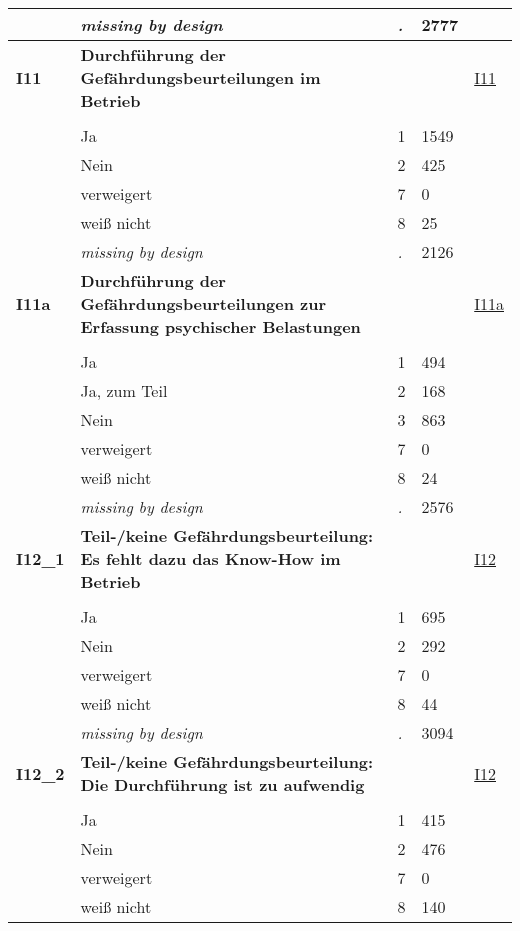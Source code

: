 \begin{longtable}{| L{2.65cm} | L{8cm} | C{1.5cm} | R{1.25cm} | C{2.25cm}  |}
   & \textit{missing by design} & \textit{.} & 2777 &  \\ 
   \midrule
\textbf{I11}\label{var:I11} & \textbf{Durchführung der Gefährdungsbeurteilungen im Betrieb} &  &  & \hyperref[I11]{I11} \\ 
   &  &  &  &  \\ 
   & Ja & 1 & 1549 &  \\ 
   & Nein & 2 & 425 &  \\ 
   & verweigert & 7 & 0 &  \\ 
   & weiß nicht & 8 & 25 &  \\ 
   & \textit{missing by design} & \textit{.} & 2126 &  \\ 
   \midrule
\textbf{I11a}\label{var:I11a} & \textbf{Durchführung der Gefährdungsbeurteilungen zur Erfassung psychischer Belastungen} &  &  & \hyperref[I11a]{I11a} \\ 
   &  &  &  &  \\ 
   & Ja & 1 & 494 &  \\ 
   & Ja, zum Teil & 2 & 168 &  \\ 
   & Nein & 3 & 863 &  \\ 
   & verweigert & 7 & 0 &  \\ 
   & weiß nicht & 8 & 24 &  \\ 
   & \textit{missing by design} & \textit{.} & 2576 &  \\ 
   \midrule
\textbf{I12\_1}\label{var:I12:1} & \textbf{Teil-/keine Gefährdungsbeurteilung: Es fehlt dazu das Know-How im Betrieb} &  &  & \hyperref[I12]{I12} \\ 
   &  &  &  &  \\ 
   & Ja & 1 & 695 &  \\ 
   & Nein & 2 & 292 &  \\ 
   & verweigert & 7 & 0 &  \\ 
   & weiß nicht & 8 & 44 &  \\ 
   & \textit{missing by design} & \textit{.} & 3094 &  \\ 
   \midrule
\textbf{I12\_2}\label{var:I12:2} & \textbf{Teil-/keine Gefährdungsbeurteilung: Die Durchführung ist zu aufwendig} &  &  & \hyperref[I12]{I12} \\ 
   &  &  &  &  \\ 
   & Ja & 1 & 415 &  \\ 
   & Nein & 2 & 476 &  \\ 
   & verweigert & 7 & 0 &  \\ 
   & weiß nicht & 8 & 140 &  \\ 

\end{longtable}
